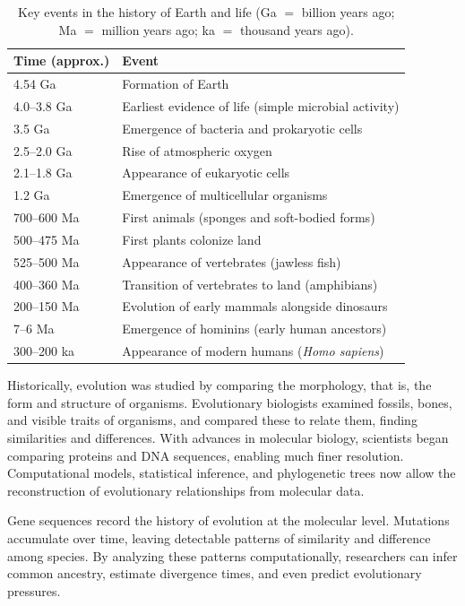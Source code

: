 \begin{table}[ht]
\centering
\caption{Key events in the history of Earth and life (Ga $=$ billion years ago; Ma $=$ million years ago; ka $=$ thousand years ago).}
\label{t:history-earth}
\begin{tabular}{ll}
\hline
\textbf{Time (approx.)} & \textbf{Event} \\
\hline
4.54 Ga & Formation of Earth \\
4.0--3.8 Ga & Earliest evidence of life (simple microbial activity) \\
3.5 Ga & Emergence of bacteria and prokaryotic cells \\
2.5--2.0 Ga & Rise of atmospheric oxygen \\
2.1--1.8 Ga & Appearance of eukaryotic cells \\
1.2 Ga & Emergence of multicellular organisms \\
700--600 Ma & First animals (sponges and soft-bodied forms) \\
500--475 Ma & First plants colonize land \\
525--500 Ma & Appearance of vertebrates (jawless fish) \\
400--360 Ma & Transition of vertebrates to land (amphibians) \\
200--150 Ma & Evolution of early mammals alongside dinosaurs \\
7--6 Ma & Emergence of hominins (early human ancestors) \\
300--200 ka & Appearance of modern humans (\textit{Homo sapiens}) \\
\hline
\end{tabular}
\end{table}

Historically, evolution was studied by comparing the morphology, that is, the form and structure of organisms. Evolutionary biologists examined fossils, bones, and visible traits of organisms, and compared these to relate them, finding similarities and differences. With advances in molecular biology, scientists began comparing proteins and DNA sequences, enabling much finer resolution. Computational models, statistical inference, and phylogenetic trees now allow the reconstruction of evolutionary relationships from molecular data.

Gene sequences record the history of evolution at the molecular level. Mutations accumulate over time, leaving detectable patterns of similarity and difference among species. By analyzing these patterns computationally, researchers can infer common ancestry, estimate divergence times, and even predict evolutionary pressures.

